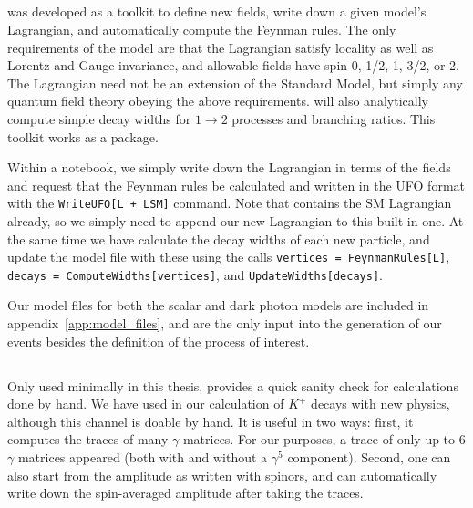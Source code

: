 \subsection{\feynrules}
\feynrules was developed as a toolkit to define new fields, write down a given model's Lagrangian, and automatically compute the Feynman rules.
The only requirements of the model are that the Lagrangian satisfy locality as well as Lorentz and Gauge invariance, and allowable fields have spin 0, 1/2, 1, 3/2, or 2. The Lagrangian need not be an extension of the Standard Model, but simply any quantum field theory obeying the above requirements. 
\feynrules will also analytically compute simple decay widths for $1 \rightarrow 2$ processes and branching ratios.
This toolkit works as a \mathematica package.

Within a \mathematica notebook, we simply write down the Lagrangian in terms of the fields and request that the Feynman rules be calculated and written in the UFO format with the \texttt{WriteUFO[L + LSM]} command. Note that \feynrules contains the SM Lagrangian already, so we simply need to append our new Lagrangian to this built-in one.
At the same time we have \feynrules calculate the decay widths of each new particle, and update the model file with these using the calls \texttt{vertices = FeynmanRules[L]}, \texttt{decays = ComputeWidths[vertices]}, and \texttt{UpdateWidths[decays]}.

Our model files for both the scalar and dark photon models are included in appendix~\ref{app:model_files}, and are the only input into the generation of our events besides the definition of the process of interest.

\subsection{\feyncalc}
Only used minimally in this thesis, \feyncalc provides a quick sanity check for calculations done by hand.
We have used \feyncalc in our calculation of $K^+$ decays with new physics, although this channel is doable by hand.
It is useful in two ways: first, it computes the traces of many $\gamma$ matrices.
For our purposes, a trace of only up to 6 $\gamma$ matrices appeared (both with and without a $\gamma^5$ component).
Second, one can also start from the amplitude as written with spinors, and \feyncalc can automatically write down the spin-averaged amplitude after taking the traces.

